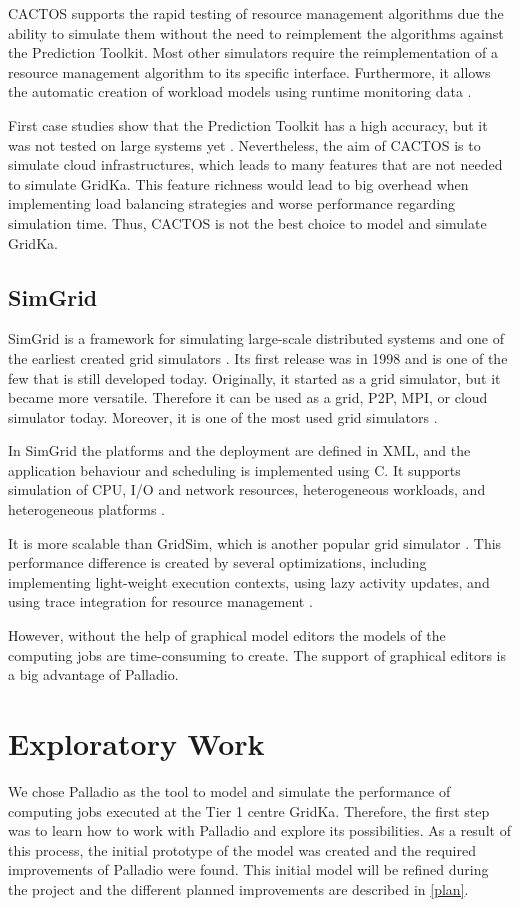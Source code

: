 CACTOS supports the rapid testing of resource management algorithms due the ability to simulate them without the need to reimplement the algorithms against the Prediction Toolkit. Most other simulators require the reimplementation of a resource management algorithm to its specific interface. Furthermore, it allows the automatic creation of workload models using runtime monitoring data \cite{rapidtesting}.

First case studies show that the Prediction Toolkit has a high accuracy, but it was not tested on large systems yet \cite{rapidtesting}. Nevertheless, the aim of CACTOS is to simulate cloud infrastructures, which leads to many features that are not needed to simulate GridKa. This feature richness would lead to big overhead when implementing load balancing strategies and worse performance regarding simulation time. Thus, CACTOS is not the best choice to model and simulate GridKa.


\section{SimGrid}
SimGrid is a framework for simulating large-scale distributed systems and one of the earliest created grid simulators \cite{simgrid_update}. Its first release was in 1998 and is one of the few that is still developed today. Originally, it started as a grid simulator, but it became more versatile. Therefore it can be used as a grid, P2P, MPI, or cloud simulator today. Moreover, it is one of the most used grid simulators \cite{simgrid_update}.

In SimGrid the platforms and the deployment are defined in XML, and the application behaviour and scheduling is implemented using C. It supports simulation of CPU, I/O and network resources, heterogeneous workloads, and heterogeneous platforms \cite{simgrid_update}.

It is more scalable than GridSim, which is another popular grid simulator \cite{simgrid_update}.
This performance difference is created by several optimizations, including implementing light-weight execution contexts, using lazy activity updates, and using trace integration for resource management \cite{simgrid_update}.

However, without the help of graphical model editors the models of the computing jobs are time-consuming to create. The support of graphical editors is a big advantage of Palladio. 


\chapter{Exploratory Work}
We chose Palladio as the tool to model and simulate the performance of computing jobs executed at the Tier 1 centre GridKa. Therefore, the first step was to learn how to work with Palladio and explore its possibilities. As a result of this process, the initial prototype of the model was created and the required improvements of Palladio were found. This initial model will be refined during the project and the different planned improvements are described in \cref{plan}.

